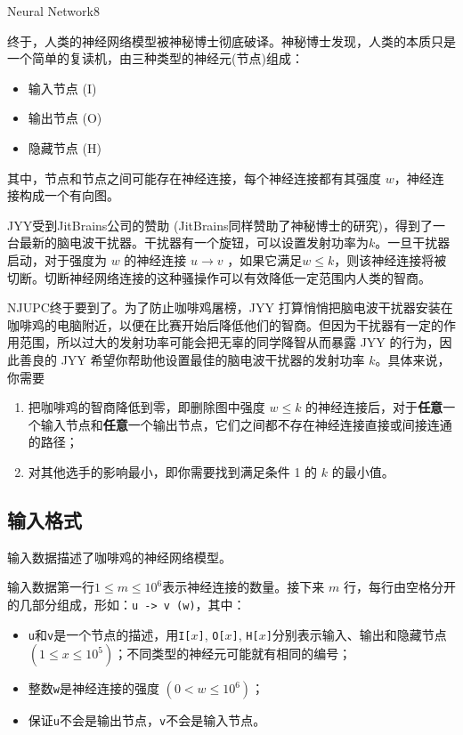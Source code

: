 \begin{Problem}{Neural Network}{8}

终于，人类的神经网络模型被神秘博士彻底破译。神秘博士发现，人类的本质只是一个简单的复读机，由三种类型的神经元(节点)组成：

\begin{itemize}
\item 输入节点 (I)
\item 输出节点 (O)
\item 隐藏节点 (H)
\end{itemize}

其中，节点和节点之间可能存在神经连接，每个神经连接都有其强度 $w$，神经连接构成一个有向图。

JYY受到JitBrains公司的赞助 (JitBrains同样赞助了神秘博士的研究)，得到了一台最新的脑电波干扰器。干扰器有一个旋钮，可以设置发射功率为$k$。一旦干扰器启动，对于强度为 $w$ 的神经连接 $u \to v$ ，如果它满足$w \le k$，则该神经连接将被切断。切断神经网络连接的这种骚操作可以有效降低一定范围内人类的智商。

NJUPC终于要到了。为了防止咖啡鸡屠榜，JYY 打算悄悄把脑电波干扰器安装在咖啡鸡的电脑附近，以便在比赛开始后降低他们的智商。但因为干扰器有一定的作用范围，所以过大的发射功率可能会把无辜的同学降智从而暴露 JYY 的行为，因此善良的 JYY 希望你帮助他设置最佳的脑电波干扰器的发射功率 $k$。具体来说，你需要

\begin{enumerate}
\item 把咖啡鸡的智商降低到零，即删除图中强度 $w \le k$ 的神经连接后，对于\textbf{任意}一个输入节点和\textbf{任意}一个输出节点，它们之间都不存在神经连接直接或间接连通的路径；
\item 对其他选手的影响最小，即你需要找到满足条件 1 的 $k$ 的最小值。
\end{enumerate}

\subsection*{输入格式}

输入数据描述了咖啡鸡的神经网络模型。

输入数据第一行$1\le m \le 10^6$表示神经连接的数量。接下来 $m$ 行，每行由空格分开的几部分组成，形如：\texttt{u -> v (w)}，其中：

\begin{itemize}
\item \texttt{u}和\texttt{v}是一个节点的描述，用\texttt{I[$x$]}, \texttt{O[$x$]}, \texttt{H[$x$]}分别表示输入、输出和隐藏节点 $(1 \le x \le 10^5)$；不同类型的神经元可能就有相同的编号；
\item 整数\texttt{w}是神经连接的强度 $(0 < w \le 10^6)$；
\item 保证\texttt{u}不会是输出节点，\texttt{v}不会是输入节点。
\end{itemize}



\end{Problem}
